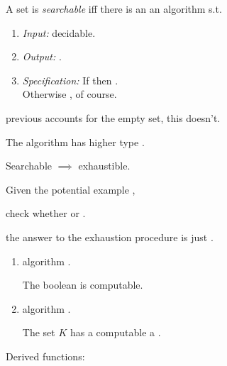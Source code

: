 \documentclass%
[%
Screen4to3,
]{foils}
\begin{document}
A set  is 
\emph{searchable} iff there is an an algorithm s.t.

\vfill

\begin{enumerate}
\item[\grey{1.}] \emph{Input:}  decidable.
\item[\grey{2.}] \emph{Output:} .
\item[\grey{3.}] \emph{Specification:} If  then . \\ 
   Otherwise
  ,  of course.
\end{enumerate}

\vfill

 previous accounts for the empty set, this doesn't.

\vfill

The algorithm has higher type .


Searchable $\implies$ exhaustible.

\vfill

Given the potential example , 

check whether  or .

\vfill

 the answer to the exhaustion procedure is just . 



\begin{enumerate}
\item[]  algorithm .

The boolean  is computable.

\item[]  algorithm .

The set $K$ has a computable a .

\end{enumerate}

\vfill

\qquad Derived functions:
\end{document}
